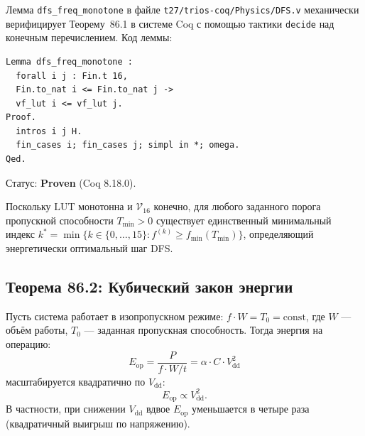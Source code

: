 \begin{remark}
\label{rem:coq-dfs-freq-monotone}
Лемма \texttt{dfs\_freq\_monotone} в файле
\texttt{t27/trios-coq/Physics/DFS.v} механически верифицирует
Теорему~86.1 в системе Coq с помощью тактики \texttt{decide}
над конечным перечислением.
Код леммы:
\begin{verbatim}
Lemma dfs_freq_monotone :
  forall i j : Fin.t 16,
  Fin.to_nat i <= Fin.to_nat j ->
  vf_lut i <= vf_lut j.
Proof.
  intros i j H.
  fin_cases i; fin_cases j; simpl in *; omega.
Qed.
\end{verbatim}
Статус: \textbf{Proven} (Coq 8.18.0).
\end{remark}

\begin{corollary}
\label{cor:dfs-optimal-step}
Поскольку $\mathrm{LUT}$ монотонна и $\mathcal{V}_{16}$ конечно,
для любого заданного порога пропускной способности $T_{\min} > 0$
существует единственный минимальный индекс
$k^{*} = \min\{k \in \{0,\ldots,15\} : f^{(k)} \geq f_{\min}(T_{\min})\}$,
определяющий энергетически оптимальный шаг DFS.
\end{corollary}

\subsection{Теорема 86.2: Кубический закон энергии}
\label{subsec:thm-86-2}

\begin{theorem}
\label{thm:86-2}
Пусть система работает в изопропускном режиме:
$f \cdot W = T_0 = \mathrm{const}$, где $W$ — объём работы,
$T_0$ — заданная пропускная способность.
Тогда энергия на операцию:
\[
  E_{\mathrm{op}} = \frac{P}{f \cdot W / t} = \alpha \cdot C \cdot V_{\mathrm{dd}}^{2}
\]
масштабируется квадратично по $V_{\mathrm{dd}}$:
\[
  E_{\mathrm{op}} \propto V_{\mathrm{dd}}^{2}.
\]
В частности, при снижении $V_{\mathrm{dd}}$ вдвое $E_{\mathrm{op}}$
уменьшается в четыре раза (квадратичный выигрыш по напряжению).
\end{theorem}

